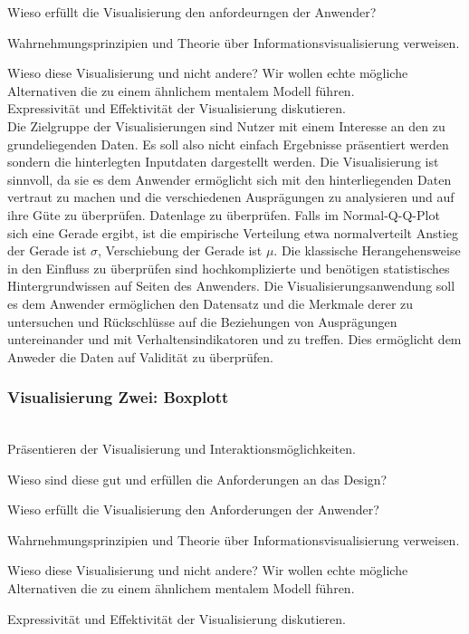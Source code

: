 \documentclass[usegeometry=true]{scrartcl}
\begin{document}
Wieso erfüllt die Visualisierung den anfordeurngen der Anwender?

Wahrnehmungsprinzipien und Theorie über Informationsvisualisierung verweisen.

Wieso diese Visualisierung und nicht andere? 
Wir wollen echte mögliche Alternativen die zu einem ähnlichem mentalem Modell führen.\\

Expressivität und Effektivität der Visualisierung diskutieren.\\
Die Zielgruppe der Visualisierungen sind Nutzer mit einem Interesse an den zu grundeliegenden Daten. 
 Es soll also nicht einfach Ergebnisse präsentiert werden sondern die hinterlegten Inputdaten dargestellt werden.
Die Visualisierung ist sinnvoll, da sie es dem Anwender ermöglicht sich mit den hinterliegenden
Daten vertraut zu machen und die verschiedenen Ausprägungen zu analysieren und auf ihre Güte zu überprüfen.
 Datenlage zu überprüfen.
Falls im Normal-Q-Q-Plot sich eine Gerade ergibt, ist die
empirische Verteilung etwa normalverteilt
Anstieg der Gerade ist $\sigma$, Verschiebung der Gerade ist $\mu$.
Die klassische Herangehensweise in den Einfluss zu überprüfen sind hochkomplizierte und benötigen
 statistisches Hintergrundwissen auf Seiten des Anwenders. Die Visualisierungsanwendung soll es dem Anwender ermöglichen 
 den Datensatz und die Merkmale derer zu untersuchen und Rückschlüsse auf die Beziehungen von Ausprägungen untereinander und mit Verhaltensindikatoren und zu treffen. Dies ermöglicht dem Anweder die Daten auf Validität zu überprüfen.\\


\subsubsection{Visualisierung Zwei: Boxplott}\\

Präsentieren der Visualisierung und Interaktionsmöglichkeiten. 

Wieso sind diese gut und erfüllen die Anforderungen an das Design?

Wieso erfüllt die Visualisierung den Anforderungen der Anwender?

Wahrnehmungsprinzipien und Theorie über Informationsvisualisierung verweisen.

Wieso diese Visualisierung und nicht andere? Wir wollen echte mögliche 
Alternativen die zu einem ähnlichem mentalem Modell führen.

Expressivität und Effektivität der Visualisierung diskutieren.\\
\end{document}
